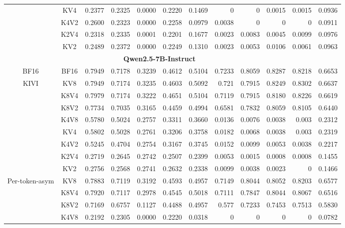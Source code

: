 \begin{table}[ht]
{\begin{tabular}{ c c | r r r r r r r r r  | r }
& KV4 & 0.2377 & 0.2325 & 0.0000 & 0.2220 & 0.1469 & 0 & 0 & 0.0015 & 0.0015 & \colorbox{blue!30}{0.0936} \\
& K4V2 & 0.2600 & 0.2323 & 0.0000 & 0.2258 & 0.0979 & 0.0038 & 0 & 0 & 0 & \colorbox{blue!30}{0.0911} \\
& K2V4 & 0.2318 & 0.2335 & 0.0001 & 0.2201 & 0.1677 & 0.0023 & 0.0083 & 0.0045 & 0.0099 & \colorbox{blue!30}{0.0976} \\
& KV2 & 0.2489 & 0.2372 & 0.0000 & 0.2249 & 0.1310 & 0.0023 & 0.0053 & 0.0106 & 0.0061 & \colorbox{blue!30}{0.0963} \\\hline
\multicolumn{11}{c}{\textbf{Qwen2.5-7B-Instruct}} \\ \hline
\multirow{1}{*}{BF16}
& BF16 & 0.7949 & 0.7178 & 0.3239 & 0.4612 & 0.5104 & 0.7233 & 0.8059 & 0.8287 & 0.8218 & 0.6653 \\\hline
\multirow{8}{*}{KIVI}
& KV8 & 0.7949 & 0.7174 & 0.3235 & 0.4603 & 0.5092 & 0.721 & 0.7915 & 0.8249 & 0.8302 & 0.6637 \\
& K8V4 & 0.7979 & 0.7174 & 0.3222 & 0.4651 & 0.5104 & 0.7119 & 0.7915 & 0.8180 & 0.8226 & 0.6619 \\
& K8V2 & 0.7734 & 0.7035 & 0.3165 & 0.4459 & 0.4994 & 0.6581 & 0.7832 & 0.8059 & 0.8105 & 0.6440 \\
& K4V8 & 0.5780 & 0.5024 & 0.2757 & 0.3311 & 0.3660 & 0.0136 & 0.0076 & 0.0038 & 0.003 & \colorbox{blue!30}{0.2312} \\
& KV4 & 0.5802 & 0.5028 & 0.2761 & 0.3206 & 0.3758 & 0.0182 & 0.0068 & 0.0038 & 0.003 & \colorbox{blue!30}{0.2319} \\
& K4V2 & 0.5245 & 0.4704 & 0.2754 & 0.3167 & 0.3745 & 0.0152 & 0.0099 & 0.0053 & 0.0038 & \colorbox{blue!30}{0.2217} \\
& K2V4 & 0.2719 & 0.2645 & 0.2742 & 0.2507 & 0.2399 & 0.0053 & 0.0015 & 0.0008 & 0.0008 & \colorbox{blue!30}{0.1455} \\
& KV2 & 0.2756 & 0.2568 & 0.2741 & 0.2632 & 0.2338 & 0.0099 & 0.0038 & 0.0023 & 0 & \colorbox{blue!30}{0.1466} \\\hline
\multirow{8}{*}{Per-token-asym}
& KV8 & 0.7883 & 0.7119 & 0.3192 & 0.4593 & 0.4957 & 0.7149 & 0.8044 & 0.8052 & 0.8203 & 0.6577 \\
& K8V4 & 0.7920 & 0.7117 & 0.2978 & 0.4545 & 0.5018 & 0.7111 & 0.7847 & 0.8044 & 0.8067 & 0.6516 \\
& K8V2 & 0.7169 & 0.6757 & 0.1127 & 0.4488 & 0.4957 & 0.577 & 0.7233 & 0.7453 & 0.7513 & \colorbox{blue!30}{0.5830} \\
& K4V8 & 0.2192 & 0.2305 & 0.0000 & 0.2220 & 0.0318 & 0 & 0 & 0 & 0 & \colorbox{blue!30}{0.0782} \\

\end{tabular}}
\end{table}
